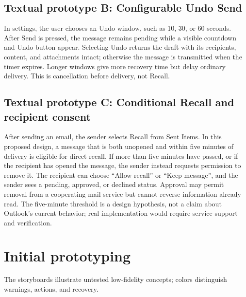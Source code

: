 \documentclass[letterpaper]{jdf}
\begin{document}
\subsection{Textual prototype B: Configurable Undo Send}

In settings, the user chooses an Undo window, such as 10, 30, or 60 seconds. After Send is pressed, the message remains pending while a visible countdown and Undo button appear. Selecting Undo returns the draft with its recipients, content, and attachments intact; otherwise the message is transmitted when the timer expires. Longer windows give more recovery time but delay ordinary delivery. This is cancellation before delivery, not Recall.

\subsection{Textual prototype C: Conditional Recall and recipient consent}

After sending an email, the sender selects Recall from Sent Items. In this proposed design, a message that is both unopened and within five minutes of delivery is eligible for direct recall. If more than five minutes have passed, or if the recipient has opened the message, the sender instead requests permission to remove it. The recipient can choose ``Allow recall'' or ``Keep message'', and the sender sees a pending, approved, or declined status. Approval may permit removal from a cooperating mail service but cannot reverse information already read. The five-minute threshold is a design hypothesis, not a claim about Outlook's current behavior; real implementation would require service support and verification.


\section{Initial prototyping}
The storyboards illustrate untested low-fidelity concepts; colors distinguish warnings, actions, and recovery.
\end{document}
